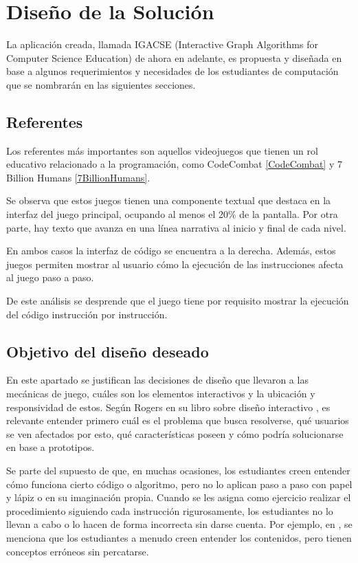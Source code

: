 \chapter{Diseño de la Solución}

La aplicación creada, llamada IGACSE (Interactive Graph Algorithms for Computer Science Education) de ahora en adelante, es propuesta y diseñada en base a algunos requerimientos y necesidades de los estudiantes de computación que se nombrarán en las siguientes secciones.

\section{Referentes}

Los referentes más importantes son aquellos videojuegos que tienen un rol educativo relacionado a la programación, como CodeCombat \ref{CodeCombat} y 7 Billion Humans \ref{7BillionHumans}.

Se observa que estos juegos tienen una componente textual que destaca en la interfaz del juego principal, ocupando al menos el 20\% de la pantalla. Por otra parte, hay texto que avanza en una línea narrativa al inicio y final de cada nivel.

En ambos casos la interfaz de código se encuentra a la derecha. Además, estos juegos permiten mostrar al usuario cómo la ejecución de las instrucciones afecta al juego paso a paso.

De este análisis se desprende que el juego tiene por requisito mostrar la ejecución del código instrucción por instrucción.

\section{Objetivo del diseño deseado}

En este apartado se justifican las decisiones de diseño que llevaron a las mecánicas de juego, cuáles son los elementos interactivos y la ubicación y responsividad de estos. Según Rogers en su libro sobre diseño interactivo \cite{Rogers2002InteractionDesign}, es relevante entender primero cuál es el problema que busca resolverse, qué usuarios se ven afectados por esto, qué características poseen y cómo podría solucionarse en base a prototipos.

Se parte del supuesto de que, en muchas ocasiones, los estudiantes creen entender cómo funciona cierto código o algoritmo, pero no lo aplican paso a paso con papel y lápiz o en su imaginación propia. Cuando se les asigna como ejercicio realizar el procedimiento siguiendo cada instrucción rigurosamente, los estudiantes no lo llevan a cabo o lo hacen de forma incorrecta sin darse cuenta. Por ejemplo, en \cite{IdentifyingStudentDifficultiesDataStructures}, se menciona que los estudiantes a menudo creen entender los contenidos, pero tienen conceptos erróneos sin percatarse.

